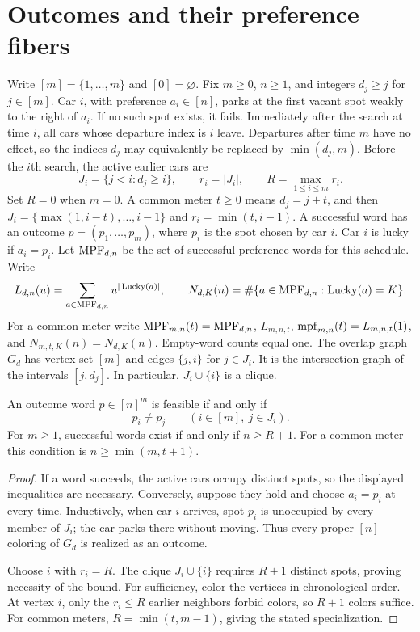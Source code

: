 \documentclass[11pt,a4paper]{article}
\begin{document}
\section{Outcomes and their preference fibers}\label{sec:outcomes}

Write $[m]=\{1,\ldots,m\}$ and $[0]=\varnothing$.
Fix $m\ge 0$, $n\ge 1$, and integers $d_j\ge j$ for $j\in[m]$.
Car $i$, with preference $a_i\in[n]$, parks at the first vacant spot
weakly to the right of $a_i$.  If no such spot exists, it fails.  Immediately
after the search at time $i$, all cars whose departure index is $i$ leave.
Departures after time $m$ have no effect, so the indices $d_j$ may equivalently
be replaced by $\min(d_j,m)$.
Before the $i$th search, the active earlier cars are
\[
 J_i=\{j<i:d_j\ge i\},\qquad r_i=|J_i|,\qquad
 R=\max_{1\le i\le m}r_i.
\]
Set $R=0$ when $m=0$.  A common meter $t\ge0$ means $d_j=j+t$, and then
$J_i=\{\max(1,i-t),\ldots,i-1\}$ and $r_i=\min(t,i-1)$.
A successful word has an outcome $p=(p_1,\ldots,p_m)$, where $p_i$ is the
spot chosen by car $i$.  Car $i$ is lucky if $a_i=p_i$.
Let $\operatorname{MPF}_{d,n}$ be the set of successful preference words for this schedule. Write
\[
 L_{d,n}(u)=\sum_{a\in\operatorname{MPF}_{d,n}}u^{|\operatorname{Lucky}(a)|},
 \qquad
 N_{d,K}(n)=\#\{a\in\operatorname{MPF}_{d,n}:\operatorname{Lucky}(a)=K\}.
\]
For a common meter write $\operatorname{MPF}_{m,n}(t)=\operatorname{MPF}_{d,n}$, $L_{m,n,t}$, $\operatorname{mpf}_{m,n}(t)=L_{m,n,t}(1)$, and $N_{m,t,K}(n)=N_{d,K}(n)$. Empty-word counts equal one.  The overlap graph $G_d$ has vertex set $[m]$
and edges $\{j,i\}$ for $j\in J_i$.  It is the intersection graph of the
intervals $[j,d_j]$.  In particular, $J_i\cup\{i\}$ is a clique.

\begin{lemma}\label{lem:outcome}
An outcome word $p\in[n]^m$ is feasible if and only if
\[
 p_i\ne p_j\qquad(i\in[m],\ j\in J_i).
\]
For $m\ge1$, successful words exist if and only if $n\ge R+1$.
For a common meter this condition is $n\ge\min(m,t+1)$.
\end{lemma}
\begin{proof}
If a word succeeds, the active cars occupy distinct spots, so the displayed
inequalities are necessary.  Conversely, suppose they hold and choose
$a_i=p_i$ at every time.  Inductively, when car $i$ arrives, spot $p_i$ is
unoccupied by every member of $J_i$; the car parks there without moving.
Thus every proper $[n]$-coloring of $G_d$ is realized as an outcome.

Choose $i$ with $r_i=R$.  The clique $J_i\cup\{i\}$ requires $R+1$ distinct
spots, proving necessity of the bound.  For sufficiency, color the vertices in
chronological order.  At vertex $i$, only the $r_i\le R$ earlier neighbors
forbid colors, so $R+1$ colors suffice.  For common meters,
$R=\min(t,m-1)$, giving the stated specialization.
\end{proof}
\end{document}
